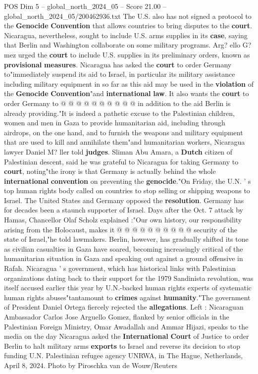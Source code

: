\begin{textsample}{POS Dim 5 – global\_north\_2024\_05 – Score 21.00 – global\_north\_2024\_05/200462936.txt}
The U.S. also has not signed a protocol to the \textbf{Genocide} \textbf{Convention} that allows countries to bring disputes to the \textbf{court}.
Nicaragua, nevertheless, sought to include U.S. arms supplies in its \textbf{case}, saying that Berlin and Washington collaborate on some military programs.
Arg? ello G? mez urged the \textbf{court} to include U.S. supplies in its preliminary orders, known as \textbf{provisional} \textbf{measures}.
Nicaragua has asked the \textbf{court} to order Germany to"immediately suspend its aid to Israel, in particular its military assistance including military equipment in so far as this aid may be used in the \textbf{violation} of the \textbf{Genocide} \textbf{Convention}"and \textbf{international} \textbf{law}.
It also wants the \textbf{court} to order Germany to @ @ @ @ @ @ @ @ @ @ in addition to the aid Berlin is already providing."It is indeed a pathetic excuse to the Palestinian children, women and men in Gaza to provide humanitarian aid, including through airdrops, on the one hand, and to furnish the weapons and military equipment that are used to kill and annihilate them"and humanitarian workers, Nicaragua lawyer Daniel M? ller told \textbf{judges}.
Sliman Abu Amara, a \textbf{Dutch} citizen of Palestinian descent, said he was grateful to Nicaragua for taking Germany to \textbf{court}, noting"the irony is that Germany is actually behind the whole \textbf{international} \textbf{convention} on preventing the \textbf{genocide}."On Friday, the U.N. ' s top human rights body called on countries to stop selling or shipping weapons to Israel.
The United States and Germany opposed the \textbf{resolution}.
Germany has for decades been a staunch supporter of Israel.
Days after the Oct. 7 attack by Hamas, Chancellor Olaf Scholz explained :"Our own history, our responsibility arising from the Holocaust, makes it @ @ @ @ @ @ @ @ @ @ security of the state of Israel,"he told lawmakers.
Berlin, however, has gradually shifted its tone as civilian casualties in Gaza have soared, becoming increasingly critical of the humanitarian situation in Gaza and speaking out against a ground offensive in Rafah.
Nicaragua ' s government, which has historical links with Palestinian organizations dating back to their support for the 1979 Sandinista revolution, was itself accused earlier this year by U.N.-backed human rights experts of systematic human rights abuses"tantamount to \textbf{crimes} against \textbf{humanity}."The government of President Daniel Ortega fiercely rejected the \textbf{allegations}.
Left : Nicaraguan Ambassador Carlos Jose Arguello Gomez, flanked by senior officials in the Palestinian Foreign Ministry, Omar Awadallah and Ammar Hijazi, speaks to the media on the day Nicaragua asked the \textbf{International} \textbf{Court} of Justice to order Berlin to halt military arms \textbf{exports} to Israel and reverse its decision to stop funding U.N.
Palestinian refugee agency UNRWA, in The Hague, Netherlands, April 8, 2024.
Photo by Piroschka van de Wouw/Reuters


\end{textsample}

